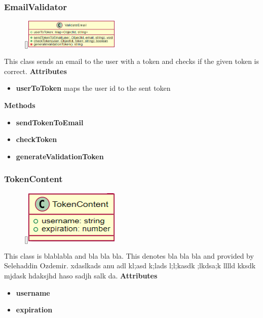 \subsubsection{EmailValidator}
\begin{figure}
    \raisebox{0pt}[\dimexpr{}\baselineskip\relax]{\includegraphics[width=4.5cm]{classes/auth/3.png}}
\end{figure} 
\par
This class sends an email to the user with a token and checks if the given token is correct.
\newline
\newline
\textbf{Attributes}
\begin{itemize}
    \item \textbf{userToToken} maps the user id to the sent token
\end{itemize}
\textbf{Methods}
\begin{itemize}
    \item \textbf{sendTokenToEmail} 
    \item \textbf{checkToken}
    \item \textbf{generateValidationToken}
\end{itemize}

\subsubsection{TokenContent}
\begin{figure}
    \raisebox{0pt}[\dimexpr{}\baselineskip\relax]{\includegraphics[width=4.5cm]{classes/auth/4.png}}
\end{figure} 
\par
This class is blablabla and bla bla bla. This denotes bla bla bla and provided by Selehaddin Ozdemir. xdaslkads anu adl kl;asd k;lads l;l;kasdk ;lkdsa;k lllld kksdk mjdask hdaksjhd haso sadjh salk da.
\newline
\newline
\textbf{Attributes}
\begin{itemize}
    \item \textbf{username}
    \item \textbf{expiration}
\end{itemize}

